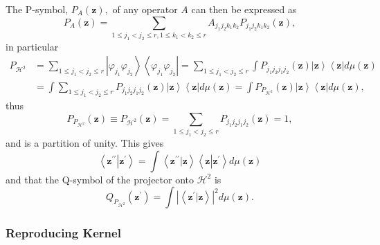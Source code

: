 \documentclass[aps,preprint]{revtex4}%
\begin{document}
The P-symbol, $P_{A}\left(  \mathbf{z}\right)  ,$ of any operator $A$ can then
be expressed as%
\begin{equation}
P_{A}\left(  \mathbf{z}\right)  =\sum_{1\leq j_{1}<j_{2}\leq r,1\leq
k_{1}<k_{2}\leq r}A_{j_{1}j_{2}k_{1}k_{2}}P_{j_{1}j_{2}k_{1}k_{2}}\left(
\mathbf{z}\right)  ,
\end{equation}
in particular
\begin{align}
P_{\mathcal{H}^{2}}  &  =\sum_{1\leq j_{1}<j_{2}\leq r}\left\vert
\varphi_{j_{1}}\varphi_{j_{2}}\right\rangle \left\langle \varphi_{j_{1}%
}\varphi_{j_{2}}\right\vert =\sum_{1\leq j_{1}<j_{2}\leq r}\int P_{j_{1}%
j_{2}j_{1}j_{2}}\left(  \mathbf{z}\right)  \left\vert \mathbf{z}\right\rangle
\left\langle \mathbf{z}\right\vert d\mu\left(  \mathbf{z}\right) \nonumber\\
&  =\int\sum_{1\leq j_{1}<j_{2}\leq r}P_{j_{1}j_{2}j_{1}j_{2}}\left(
\mathbf{z}\right)  \left\vert \mathbf{z}\right\rangle \left\langle
\mathbf{z}\right\vert d\mu\left(  \mathbf{z}\right)  =\int P_{P_{\mathcal{H}%
^{2}}}\left(  \mathbf{z}\right)  \left\vert \mathbf{z}\right\rangle
\left\langle \mathbf{z}\right\vert d\mu\left(  \mathbf{z}\right)  ,
\end{align}
thus%
\begin{equation}
P_{P_{\mathcal{H}^{2}}}\left(  \mathbf{z}\right)  \equiv P_{\mathcal{H}^{2}%
}\left(  \mathbf{z}\right)  =\sum_{1\leq j_{1}<j_{2}\leq r}P_{j_{1}j_{2}%
j_{1}j_{2}}\left(  \mathbf{z}\right)  =1,
\end{equation}
and is a partition of unity. This gives%
\begin{equation}
\left\langle \mathbf{z}^{\prime\prime}\left\vert \mathbf{z}^{\prime}\right.
\right\rangle =\int\left\langle \mathbf{z}^{\prime\prime}\left\vert
\mathbf{z}\right.  \right\rangle \left\langle \mathbf{z}\left\vert
\mathbf{z}^{\prime}\right.  \right\rangle d\mu\left(  \mathbf{z}\right)
\end{equation}
and that the Q-symbol of the projector onto $\mathcal{H}^{2}$ is
\begin{equation}
Q_{P_{\mathcal{H}^{2}}}\left(  \mathbf{z}^{\prime}\right)  =\int\left\vert
\left\langle \mathbf{z}^{\prime}\left\vert \mathbf{z}\right.  \right\rangle
\right\vert ^{2}d\mu\left(  \mathbf{z}\right)  .
\end{equation}


\subsubsection{Reproducing Kernel}
\end{document}

